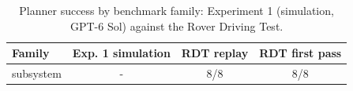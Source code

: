 \begin{table}[htbp]
\centering
\caption{Planner success by benchmark family: Experiment 1 (simulation, GPT-6 Sol) against the Rover Driving Test.}
\label{tab:rdt_family_bridge}
\small
\begin{tabular}{lccc}
\toprule
Family & Exp. 1 simulation & RDT replay & RDT first pass \\
\midrule
subsystem & - & 8/8 & 8/8 \\
\bottomrule
\end{tabular}
\end{table}
